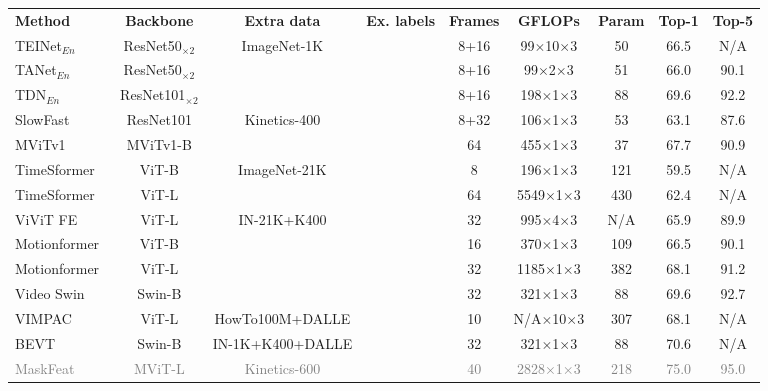 \documentclass{article}
\newcommand{\cmark}{\ding{51}}%
\newcommand{\xmark}{\ding{55}}%
\def\x{$\times$}
\newcommand{\tablestyle}[2]{\setlength{\tabcolsep}{#1}\renewcommand{\arraystretch}{#2}\centering\footnotesize}
\begin{document}
\begin{table}[t!]
\centering
\tablestyle{2.0pt}{1.04}
\begin{tabular}{l|c|c|c|c|c|c|c|c}
\textbf{Method} & \textbf{Backbone} & \textbf{Extra data} & \textbf{Ex. labels} & \textbf{Frames} & \textbf{GFLOPs}  & \textbf{Param} & \textbf{Top-1}  & \textbf{Top-5} \\
\shline\hline
TEINet$_{En}$~\cite{teinet} &  \footnotesize{ResNet50$_{\times 2}$} &  \multirow{3}{*}{ImageNet-1K} & \cmark & 8+16 &  99\x10\x3 & 50 & 66.5 & N/A \\
TANet$_{En}$~\cite{tanet} &  \footnotesize{ResNet50$_{\times 2}$} & & \cmark & 8+16 & 99\x2\x3 & 51 & 66.0 & 90.1 \\
TDN$_{En}$~\cite{tdn} & \footnotesize{ResNet101$_{\times 2}$} &   & \cmark & 8+16 & 198\x1\x3 & 88 & 69.6 & 92.2   \\
\hline
SlowFast~\cite{slowfast} &  ResNet101 &  \multirow{2}{*}{Kinetics-400} & \cmark & 8+32 & 106\x1\x3 & 53 & 63.1 & 87.6 \\
MViTv1~\cite{mvit} & MViTv1-B &  & \cmark & 64 & 455\x1\x3 & 37 & 67.7 & 90.9  \\
\hline
TimeSformer~\cite{timesformer} & ViT-B & \multirow{2}{*}{ImageNet-21K} & \cmark & 8 & 196\x1\x3 & 121 & 59.5 &  N/A \\
TimeSformer~\cite{timesformer} & ViT-L &  & \cmark & 64  & 5549\x1\x3 & 430 & 62.4 & N/A \\
\hline
ViViT FE~\cite{vivit} & ViT-L & \multirow{4}{*}{\footnotesize IN-21K+K400} & \cmark & 32 & 995\x 4\x3 & N/A & 65.9 & 89.9 \\
Motionformer~\cite{motionformer} & ViT-B &    & \cmark & 16 & 370\x1\x3 & 109  & 66.5 & 90.1 \\
Motionformer~\cite{motionformer} & ViT-L &    & \cmark & 32 & 1185\x1\x3 & 382  & 68.1 & 91.2 \\
Video Swin~\cite{liu2021video}  & Swin-B &   & \cmark & 32 & 321\x1\x3 & 88 & 69.6 & 92.7  \\
\hline
VIMPAC~\cite{vimpac} & ViT-L & \scriptsize{HowTo100M+DALLE} & \xmark & 10 & N/A\x10\x3 & 307 & 68.1 & N/A \\
BEVT~\cite{bevt}  & Swin-B & \scriptsize{IN-1K+K400+DALLE}  & \xmark & 32 & 321\x1\x3 & 88 & 70.6 & N/A  \\
\textcolor{gray}{MaskFeat{\scriptsize\textuparrow312}~\cite{wei2021masked}} & \textcolor{gray}{MViT-L} & \textcolor{gray}{Kinetics-600} & \textcolor{gray}{\cmark} & \textcolor{gray}{40}  & \textcolor{gray}{2828\x1\x3} & \textcolor{gray}{218} & \textcolor{gray}{75.0} & \textcolor{gray}{95.0} \\

\end{tabular}
\end{table}
\end{document}
